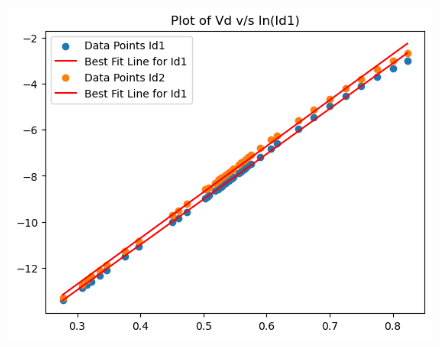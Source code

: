 \documentclass[12pt]{article}
\begin{document}
\begin{figure}[h!]
    \qquad
\end{figure}

\begin{figure}[h!]
    \centering
    \includegraphics[scale=0.8]{combined_plot.png}
\end{figure}
\end{document}

